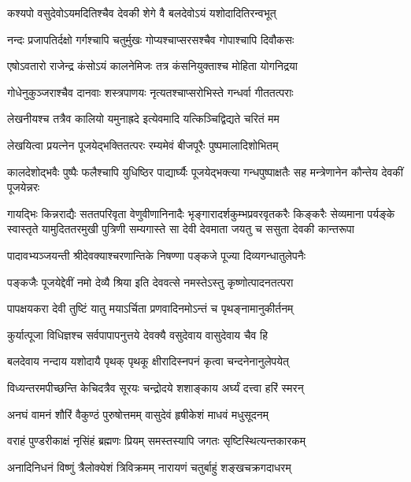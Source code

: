 \twolineshloka
{कश्यपो वसुदेवोऽयमदितिश्चैव देवकी}
{शेगे वै बलदेवोऽयं यशोदादितिरन्वभूत्}%

\twolineshloka
{नन्दः प्रजापतिर्दक्षो गर्गश्चापि चतुर्मुखः}
{गोप्यश्चाप्सरसश्चैव गोपाश्चापि दिवौकसः}%

\twolineshloka
{एषोऽवतारो राजेन्द्र कंसोऽयं कालनेमिजः}
{तत्र कंसनियुक्ताश्च मोहिता योगनिद्रया}%

\twolineshloka
{गोधेनुकुञ्जराश्चैव दानवाः शस्त्रपाणयः}
{नृत्यतश्चाप्सरोभिस्ते गन्धर्वा गीततत्पराः}%

\twolineshloka
{लेखनीयश्च तत्रैव कालियो यमुनाह्रदे}
{इत्येवमादि यत्किञ्चिद्विद्यते चरितं मम}%

\twolineshloka
{लेखयित्वा प्रयत्नेन पूजयेद्भक्तितत्परः}
{रम्यमेवं बीजपूरैः पुष्पमालादिशोभितम्}%

\threelineshloka
{कालदेशोद्भवैः पुष्पैः फलैश्चापि युधिष्ठिर}
{पाद्यार्घ्यैः पूजयेद्भक्त्या गन्धपुष्पाक्षतैः सह}
{मन्त्रेणानेन कौन्तेय देवकीं पूजयेन्नरः}%

\fourlineindentedshloka
{गायद्भिः किन्नराद्यैः सततपरिवृता वेणुवीणानिनादैः}
{भृङ्गारादर्शकुम्भप्रवरवृतकरैः किङ्करैः सेव्यमाना}
{पर्यङ्के स्वास्तृते यामुदिततरमुखी पुत्रिणी सम्यगास्ते}
{सा देवी देवमाता जयतु च ससुता देवकी कान्तरूपा}%


\twolineshloka
{पादावभ्यञ्जयन्ती श्रीदेवक्याश्चरणान्तिके}
{निषण्णा पङ्कजे पूज्या दिव्यगन्धातुलेपनैः}%


\twolineshloka
{पङ्कजैः पूजयेद्देवीं नमो देव्यै श्रिया इति}
{देववत्से नमस्तेऽस्तु कृष्णोत्पादनतत्परा}%


\twolineshloka
{पापक्षयकरा देवी तुष्टिं यातु मयाऽर्चिता}
{प्रणवादिनमोऽन्तं च पृथङ्नामानुकीर्तनम्}%


\twolineshloka
{कुर्यात्पूजा विधिज्ञश्च सर्वपापापनुत्तये}
{देवक्यै वसुदेवाय वासुदेवाय चैव हि}%


\twolineshloka
{बलदेवाय नन्दाय यशोदायै पृथक् पृथकू}
{क्षीरादिस्नपनं कृत्वा चन्दनेनानुलेपयेत्}%


\twolineshloka
{विध्यन्तरमपीच्छन्ति केचिदत्रैव सूरयः}
{चन्द्रोदये शशाङ्काय अर्घ्यं दत्त्वा हरिं स्मरन्}%


\twolineshloka
{अनघं वामनं शौरिं वैकुण्ठं पुरुषोत्तमम्}
{वासुदेवं हृषीकेशं माधवं मधुसूदनम्}%


\twolineshloka
{वराहं पुण्डरीकाक्षं नृसिंहं ब्रह्मणः प्रियम्}
{समस्तस्यापि जगतः सृष्टिस्थित्यन्तकारकम्}%


\twolineshloka
{अनादिनिधनं विष्णुं त्रैलोक्येशं त्रिविक्रमम्}
{नारायणं चतुर्बाहुं शङ्खचक्रगदाधरम्}%



